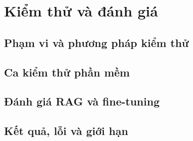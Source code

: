 \section{Kiểm thử và đánh giá}
\label{sec:evaluation}

\subsection{Phạm vi và phương pháp kiểm thử}
\par\noindent\mbox{}\par\vspace{2mm}

\subsection{Ca kiểm thử phần mềm}
\par\noindent\mbox{}\par\vspace{2mm}

\subsection{Đánh giá RAG và fine-tuning}
\par\noindent\mbox{}\par\vspace{2mm}

\subsection{Kết quả, lỗi và giới hạn}
\par\noindent\mbox{}\par\vspace{2mm}
